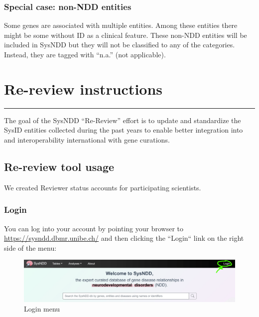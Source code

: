 \documentclass[
]{article}
\begin{document}
\hypertarget{special-case-non-ndd-entities}{%
\subsubsection{Special case: non-NDD entities}\label{special-case-non-ndd-entities}}

Some genes are associated with multiple entities. Among these entities there might be some without ID as a clinical feature. These non-NDD entities will be included in SysNDD but they will not be classified to any of the categories. Instead, they are tagged with ``n.a.'' (not applicable).

\hypertarget{re-review-instructions}{%
\section{Re-review instructions}\label{re-review-instructions}}

\begin{center}\rule{0.5\linewidth}{0.5pt}\end{center}

The goal of the SysNDD ``Re-Review'' effort is to update and standardize the SysID entities collected during the past years to enable better integration into and interoperability international with gene curations.

\hypertarget{re-review-tool-usage}{%
\subsection{Re-review tool usage}\label{re-review-tool-usage}}

We created Reviewer status accounts for participating scientists.

\hypertarget{login}{%
\subsubsection{Login}\label{login}}

You can log into your account by pointing your browser to \url{https://sysndd.dbmr.unibe.ch/} and then clicking the ``Login`` link on the right side of the menu:

\begin{figure}
\centering
\includegraphics{./static/img/sysndd_login.png}
\caption{Login menu}
\end{figure}
\end{document}
